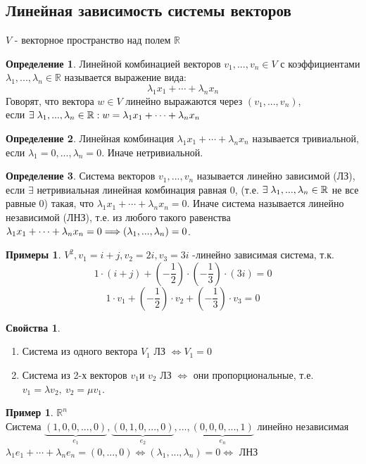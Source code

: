\documentclass[a4paper, 12pt]{article}
\newcommand{\R}{\mathbb R}
\newcommand\tab[1][.5cm]{\hspace*{#1}}
\theoremstyle{definition}
\newtheorem*{definition}{Определение}
\newtheorem*{example}{Примеры}
\newtheorem*{example1}{Пример}
\newtheorem*{properties}{Свойства}
\begin{document}
  \subsection{Линейная зависимость системы векторов}
  $V$ - векторное пространство над полем $\R$
  \begin{definition}
    Линейной комбинацией векторов $v_1,...,v_n \in V$ с коэффициентами $\lambda_1,...,\lambda_n \in \R$ называется выражение вида: 
    $$\lambda_1 x_1 + \cdots + \lambda_n x_n$$ 
    Говорят, что вектора $w \in V$ линейно выражаются через $(v_1,...,v_n)$, \\ если $\exists\tab[0.1cm]\lambda_1,...,\lambda_n \in \R: w = \lambda_1 x_1 + \cdots + \lambda_n x_n$   
  \end{definition}   
  \begin{definition}
    Линейная комбинация $\lambda_1 x_1 + \cdots + \lambda_n x_n$ называется тривиальной, если $\lambda_1 = 0,...,\lambda_n = 0$. Иначе нетривиальной.
  \end{definition}
  \begin{definition}
    Система векторов $v_1,...,v_n$ называется линейно зависимой (ЛЗ), если $\exists$ нетривиальная линейная комбинация равная 0, (т.е. $\exists \tab[0.1cm]\lambda_1,...,\lambda_n \in \R$ не все равные 0) такая, что $\lambda_1 x_1 + \cdots + \lambda_n x_n = 0$. Иначе система называется линейно независимой (ЛНЗ), т.е. из любого такого равенства $\lambda_1 x_1 + \cdots + \lambda_n x_n = 0 \\ \Longrightarrow (\lambda_1,...,\lambda_n) = 0$.
  \end{definition}
  \begin{example}
    $V^2, v_1 = i + j, v_2 = 2i, v_3 = 3i$ -линейно зависимая система, т.к. $$1 \cdot (i + j) + (- \frac{1}{2}) \cdot (-\frac{1}{3}) \cdot (3i) = 0$$ $$1 \cdot v_1 + (-\frac{1}{2}) \cdot v_2 + (-\frac{1}{3}) \cdot v_3 = 0$$  
  \end{example}  
  \begin{properties} \end{properties} 
    \begin{enumerate}
      \item Система из одного вектора $V_1$ ЛЗ $\Longleftrightarrow V_1 = 0$  
      \item Система из 2-х векторов $v_1 \text{и } v_2$ ЛЗ $\Longleftrightarrow$ они пропорциональные, т.е. \\$v_1 = \lambda v_2, \  v_2 = \mu v_1$. 
    \end{enumerate}
  \begin{example1}
    $\R^n$ \\
    Система $\underbrace{(1,0,0,...,0)}_{e_1} , \underbrace{(0,1,0,...,0)}_{e_2},...,\underbrace{(0,0,0,...,1)}_{e_n}$ линейно независимая \\
    $\lambda_1 e_1 + \cdots + \lambda_n e_n = (0,...,0) \Longleftrightarrow (\lambda_1,...,\lambda_n) = 0 \Longleftrightarrow $ ЛНЗ 
  \end{example1}
\end{document}

